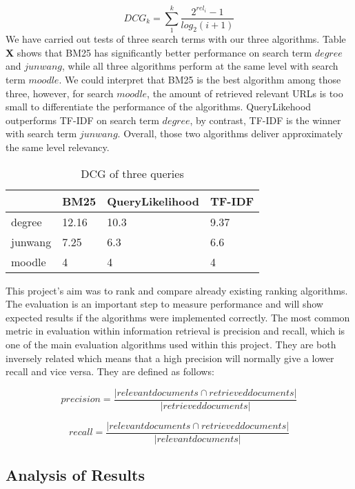 \[DCG_{k}=\sum_1^k \frac{2^{rel_{i}}-1}{log_{2}(i+1)}\]
We have carried out tests of three search terms with our three algorithms. Table \textbf{X} shows that BM25 has significantly better performance on search term $degree$ and $junwang$, while all three algorithms perform at the same level with search term $moodle$. We could interpret that BM25 is the best algorithm among those three, however, for search $moodle$, the amount of retrieved relevant URLs is too small to differentiate the performance of the algorithms. QueryLikehood outperforms TF-IDF on search term $degree$, by contrast, TF-IDF is the winner with search term $junwang$. Overall, those two algorithms deliver approximately the same level relevancy.


\begin{table}[]
\centering
\caption{DCG of three queries}
\label{my-label}
\begin{tabular}{|l|l|l|l|}
\hline
        & BM25  & QueryLikelihood & TF-IDF \\ \hline
degree  & 12.16 & 10.3            & 9.37   \\ \hline
junwang & 7.25  & 6.3             & 6.6    \\ \hline
moodle  & 4     & 4               & 4      \\ \hline
\end{tabular}
\end{table}

This project's aim was to rank and compare already existing ranking algorithms. The evaluation is an important step to measure performance and will show expected results if the algorithms were implemented correctly. The most common metric in evaluation within information retrieval is precision and recall, which is one of the main evaluation algorithms used within this project. They are both inversely related which means that a high precision will normally give a lower recall and vice versa. They are defined as follows:

$$precision = \frac{|relevant documents \cap retrieved documents|}{|retrieved documents|}$$

$$recall = \frac{|relevant documents \cap retrieved documents|}{|relevant documents|}$$


\subsection{Analysis of Results} %
\label{sub:analysis_of_results}

